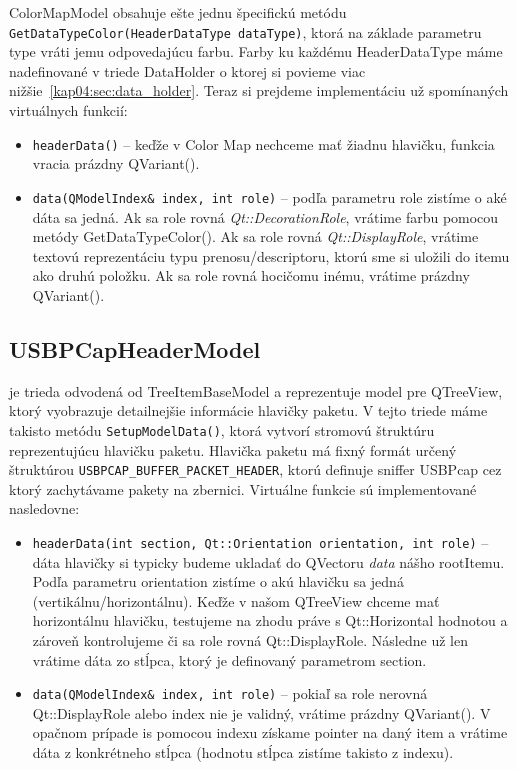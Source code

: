 ColorMapModel obsahuje ešte jednu špecifickú metódu \texttt{GetDataTypeColor(HeaderDataType dataType)}, ktorá na základe parametru type vráti jemu odpovedajúcu farbu. Farby ku každému HeaderDataType máme nadefinované v triede DataHolder o ktorej si povieme viac nižšie~\ref{kap04:sec:data_holder}. Teraz si prejdeme implementáciu už spomínaných virtuálnych funkcií:
\begin{itemize}
\item \texttt{headerData()} -- keďže v Color Map nechceme mať žiadnu hlavičku, funkcia vracia prázdny QVariant().
\item \texttt{data(QModelIndex\& index, int role)} -- podľa parametru role zistíme o aké dáta sa jedná. Ak sa role rovná \textit{Qt::DecorationRole}, vrátime farbu pomocou metódy GetDataTypeColor(). Ak sa role rovná \textit{Qt::DisplayRole}, vrátime textovú reprezentáciu typu prenosu/descriptoru, ktorú sme si uložili do itemu ako druhú položku. Ak sa role rovná hocičomu inému, vrátime prázdny QVariant().
\end{itemize}


\subsection{USBPCapHeaderModel}
je trieda odvodená od TreeItemBaseModel a reprezentuje model pre QTreeView, ktorý vyobrazuje detailnejšie informácie hlavičky paketu. V tejto triede máme takisto metódu \texttt{SetupModelData()}, ktorá vytvorí stromovú štruktúru reprezentujúcu hlavičku paketu. Hlavička paketu má fixný formát určený štruktúrou \texttt{USBPCAP\_BUFFER\_PACKET\_HEADER}, ktorú definuje sniffer USBPcap cez ktorý zachytávame pakety na zbernici.
Virtuálne funkcie sú implementované nasledovne:
\begin{itemize}
\label{kap04:sec:usbh_virt}
\item \texttt{headerData(int section, Qt::Orientation orientation, int role)} -- dáta hlavičky si typicky budeme ukladať do QVectoru \textit{data} nášho rootItemu. Podľa parametru orientation zistíme o akú hlavičku sa jedná (vertikálnu/horizontálnu). Keďže v našom QTreeView chceme mať horizontálnu hlavičku, testujeme na zhodu práve s Qt::Horizontal hodnotou a zároveň kontrolujeme či sa role rovná Qt::DisplayRole. Následne už len vrátime dáta zo stĺpca, ktorý je definovaný parametrom section.
\item \texttt{data(QModelIndex\& index, int role)} -- pokiaľ sa role nerovná Qt::DisplayRole alebo index nie je validný, vrátime prázdny QVariant(). V opačnom prípade is pomocou indexu získame pointer na daný item a vrátime dáta z konkrétneho stĺpca (hodnotu stĺpca zistíme takisto z indexu).
\end{itemize}

